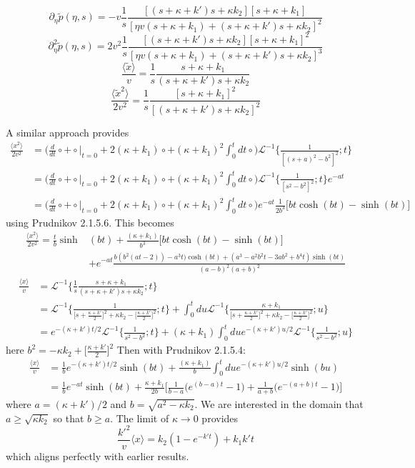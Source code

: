 \documentclass[]{agujournal2018}
\newcommand\be{\begin{equation}}
\newcommand\ee{\end{equation}}
\newcommand\bra{\langle}
\newcommand\ket{\rangle}
\newcommand\tp{\tilde{p}}
\newcommand\El{\mathcal{L}}
\begin{document}
\be \partial_\eta \tp(\eta,s) = -v \frac{1}{s}\frac{[(s+\kappa + k')s + \kappa k_2][s+\kappa + k_1]}{[\eta v(s+\kappa +k_1) + (s+ \kappa + k')s+\kappa k_2]^2}\ee
\be \partial_\eta^2 \tp(\eta,s) = 2v^2 \frac{1}{s} \frac{[(s+\kappa + k')s+\kappa k_2][s+\kappa + k_1]^2}{[\eta v(s+\kappa + k_1) + (s+\kappa + k')s+ \kappa k_2]^3}\ee
\be  \frac{\bra\tilde{x}\ket} {v} = \frac{1}{s}\frac{s+\kappa + k_1}{(s+\kappa + k')s + \kappa k_2}\ee
\be \frac{\bra \tilde{x}^2 \ket}{2v^2} = \frac{1}{s} \frac{[s+\kappa + k_1]^2}{[(s+\kappa + k')s + \kappa k_2]^2} \ee

A similar approach provides 
\begin{align}
\frac{\bra x^2 \ket}{2v^2} &= \Big(\frac{d}{dt}\circ + \circ \Big|_{t=0} + 2(\kappa + k_1)\circ + (\kappa+k_1)^2\int_0^t dt \circ \Big)\El^{-1}\Big\{\frac{1}{[(s+a)^2-b^2]^2};t\Big\}\\
&= \Big(\frac{d}{dt}\circ + \circ \Big|_{t=0} + 2(\kappa + k_1)\circ + (\kappa+k_1)^2\int_0^t dt \circ \Big)\El^{-1}\Big\{\frac{1}{[s^2-b^2]^2};t\Big\}e^{-at}\\
&= \Big(\frac{d}{dt}\circ + \circ \Big|_{t=0} + 2(\kappa + k_1)\circ + (\kappa+k_1)^2\int_0^t dt \circ \Big)e^{-at}\frac{1}{2b^3}\Big[bt\cosh(bt)-\sinh(bt)\Big]
\end{align}
using Prudnikov 2.1.5.6.
This becomes
\begin{align}
\frac{\bra x^2 \ket}{2v^2} = \frac{t}{b}\sinh&(bt) + \frac{(\kappa + k_1)}{b^3}\big[bt\cosh(bt)-\sinh(bt)\big]\\
&+e^{-at}\frac{b(b^2(at-2))-a^3t)\cosh(bt) +(a^3-a^2b^2t-3ab^2+b^4t)\sinh(bt)}{(a-b)^2(a+b)^2}
\end{align}
\begin{align}
\frac{\bra x \ket}{v} &= \El^{-1}\Big\{\frac{1}{s}\frac{s+\kappa + k_1}{(s+\kappa + k')s + \kappa k_2};t\Big\} \\
&= \El^{-1}\Big\{\frac{1}{\big[s+\frac{\kappa+k'}{2}\big]^2+\kappa k_2 - \big[\frac{\kappa+k'}{2}\big]^2};t\Big\} + 
\int_0^t du \El^{-1}\Big\{\frac{\kappa + k_1}{\big[s+\frac{\kappa+k'}{2}\big]^2+\kappa k_2 - \big[\frac{\kappa+k'}{2}\big]^2};u\Big\}\\
&= e^{-(\kappa + k')t/2}\El^{-1}\Big\{\frac{1}{s^2 - b^2};t\Big\} + (\kappa + k_1)\int_0^t du e^{-(\kappa + k')u/2}\El^{-1}\Big\{\frac{1}{s^2 - b^2};u\Big\}
\end{align}
here $b^2 = -\kappa k_2 + \big[\frac{\kappa+k'}{2}\big]^2$
Then with Prudnikov 2.1.5.4:
\begin{align}
\frac{\bra x \ket}{v} &= \frac{1}{b}e^{-(\kappa + k')t/2}\sinh(bt) + \frac{(\kappa +k_1)}{b}\int_0^t due^{-(\kappa + k')u/2}\sinh(bu)\\
&=  \frac{1}{b}e^{-at}\sinh(bt) + \frac{\kappa + k_1}{2b}\Big[\frac{1}{b-a}\Big(e^{(b-a)t}-1\Big)+ \frac{1}{a+b}\Big(e^{-(a+b)t}-1\Big)\Big]
\end{align}
where $a=(\kappa + k')/2$ and $b = \sqrt{a^2 -\kappa k_2}$. We are interested in the domain that $a\geq \sqrt{\kappa k_2}$ so that $b\geq a$.
The limit of $\kappa \rightarrow 0$ provides
\be \frac{k'^2}{v}\bra x \ket=k_2(1-e^{-k't})+ k_1k't \ee
which aligns perfectly with earlier results.
\end{document}

